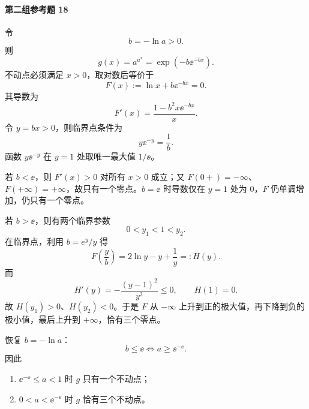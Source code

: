 \paragraph{第二组参考题 18}
\begin{xsolution}
令
\[
  b=-\ln a>0.
\]
则
\[
  g(x)=a^{a^x}=\exp(-b\ee^{-bx}).
\]
不动点必须满足 $x>0$，取对数后等价于
\[
  F(x):=\ln x+b\ee^{-bx}=0.
\]
其导数为
\[
  F'(x)=\frac{1-b^2x\ee^{-bx}}x.
\]
令 $y=bx>0$，则临界点条件为
\[
  y\ee^{-y}=\frac1b.
\]
函数 $y\ee^{-y}$ 在 $y=1$ 处取唯一最大值 $1/\ee$。

若 $b<\ee$，则 $F'(x)>0$ 对所有 $x>0$ 成立；又 $F(0+)=-\infty$、$F(+\infty)=+\infty$，故只有一个零点。$b=\ee$ 时导数仅在 $y=1$ 处为 0，$F$ 仍单调增加，仍只有一个零点。

若 $b>\ee$，则有两个临界参数
\[
  0<y_1<1<y_2.
\]
在临界点，利用 $b=e^y/y$ 得
\[
  F\left(\frac yb\right)
  =2\ln y-y+\frac1y=:H(y).
\]
而
\[
  H'(y)=-\frac{(y-1)^2}{y^2}\le0,
  \qquad H(1)=0.
\]
故 $H(y_1)>0$、$H(y_2)<0$。于是 $F$ 从 $-\infty$ 上升到正的极大值，再下降到负的极小值，最后上升到 $+\infty$，恰有三个零点。

恢复 $b=-\ln a$：
\[
  b\le\ee\iff a\ge\ee^{-\ee}.
\]
因此
\begin{enumerate}[label=(\arabic*)]
  \item $\ee^{-\ee}\le a<1$ 时 $g$ 只有一个不动点；
  \item $0<a<\ee^{-\ee}$ 时 $g$ 恰有三个不动点。
\end{enumerate}
\end{xsolution}

